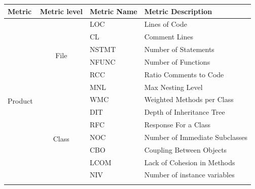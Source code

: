 \documentclass[10pt,journal,compsoc]{IEEEtran}
\begin{document}
\begin{table}[!t]
 

\scriptsize
\begin{tabular}{|p{1cm}|c|l|p{3cm}|}
\hline
\multicolumn{1}{|l|}{\textbf{Metric}}        & \multicolumn{1}{l|}{\textbf{Metric level}} & \textbf{Metric Name} &\textbf{ Metric Description}             \\ \hline
\multirow{21}{*}{Product   } & \multirow{6}{*}{File}             & LOC         & Lines of Code                  \\ \cline{3-4} 
                                  &                                   & CL          & Comment Lines                  \\ \cline{3-4} 
                                  &                                   & NSTMT       & Number of Statements           \\ \cline{3-4} 
                                  &                                   & NFUNC       & Number of Functions            \\ \cline{3-4} 
                                  &                                   & RCC         & Ratio Comments to Code         \\ \cline{3-4} 
                                  &                                   & MNL         & Max Nesting Level              \\ \cline{2-4} 
                                  & \multirow{12}{*}{Class}           & WMC         & Weighted Methods per Class     \\ \cline{3-4} 
                                  &                                   & DIT         & Depth of Inheritance Tree      \\ \cline{3-4} 
                                  &                                   & RFC         & Response For a Class           \\ \cline{3-4} 
                                  &                                   & NOC         & Number of Immediate Subclasses \\ \cline{3-4} 
                                  &                                   & CBO         & Coupling Between Objects       \\ \cline{3-4} 
                                  &                                   & LCOM        & Lack of Cohesion in Methods    \\ \cline{3-4} 
                                  &                                   & NIV         & Number of instance variables   \\ \cline{3-4} 

\end{tabular}
\end{table}
\end{document}
